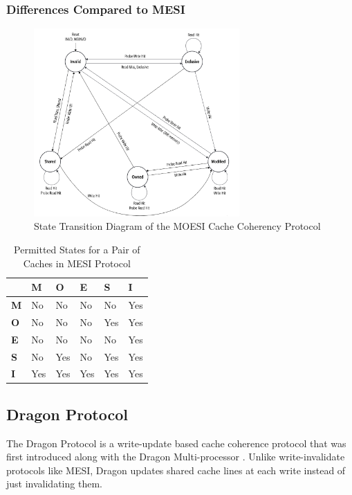 \documentclass[nonacm,acmsmall,screen,11pt]{acmart}
\begin{document}
\subsubsection{Differences Compared to MESI}


\begin{figure}[htb!]
  \centering
  \includegraphics[width=0.7\textwidth]{moesi}
  \caption{State Transition Diagram of the MOESI Cache Coherency Protocol}
  \label{fig:moesi}
\end{figure}

\begin{table}[htb!]
  \centering
  \caption{Permitted States for a Pair of Caches in MESI Protocol}
  \label{tab:moesi}
  \begin{tabular}{|l|l|l|l|l|l|}
    \hline
               & \textbf{M} & \textbf{O} & \textbf{E} & \textbf{S} & \textbf{I} \\ \hline
    \textbf{M} & No         & No         & No         & No         & Yes        \\ \hline
    \textbf{O} & No         & No         & No         & Yes        & Yes        \\ \hline
    \textbf{E} & No         & No         & No         & No         & Yes        \\ \hline
    \textbf{S} & No         & Yes        & No         & Yes        & Yes        \\ \hline
    \textbf{I} & Yes        & Yes        & Yes        & Yes        & Yes        \\ \hline
  \end{tabular}
\end{table}

\subsection{Dragon Protocol}
The Dragon Protocol is a write-update based cache coherence protocol that was first introduced along with the Dragon Multi-processor \cite{atkinson1987dragon}. Unlike write-invalidate protocols like MESI, Dragon updates shared cache lines at each write instead of just invalidating them. 
\end{document}
